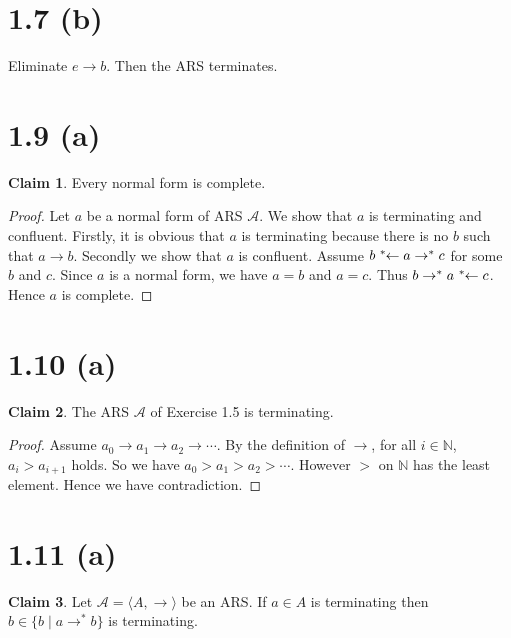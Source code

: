 \documentclass[autodetect-enginem]{article}
\title{}
\author{}
\date{}
\theoremstyle{plain}
\theoremstyle{definition}
\newtheorem*{claim*}{Claim}
\begin{document}
\section*{1.7 (b)}

Eliminate $e \rightarrow b$. Then the ARS terminates.

\section*{1.9 (a)}

\begin{claim*}
    Every normal form is complete.
\end{claim*}

\begin{proof}
    Let $a$ be a normal form of ARS $\mathcal{A}$.
    We show that $a$ is terminating and confluent.
    Firstly, it is obvious that $a$ is terminating because there is no $b$ such that $a \rightarrow b$.
    Secondly we show that $a$ is confluent.
    Assume $b \;\reflectbox{$\rightarrow^*$}\; a \rightarrow^* c$ for some $b$ and $c$.
    Since $a$ is a normal form, we have $a=b$ and $a=c$. Thus $b \rightarrow^* a \;\reflectbox{$\rightarrow^*$} \; c$.
    Hence $a$ is complete.
\end{proof}

\section*{1.10 (a)}

\begin{claim*}
    The ARS $\mathcal{A}$ of Exercise 1.5 is terminating.
\end{claim*}

\begin{proof}
    Assume $a_0 \to a_1 \to a_2 \to \cdots$.
    By the definition of $\to$, for all $i \in \mathbb{N}$, $a_i > a_{i+1}$ holds.
    So we have $a_0 > a_1 > a_2 > \cdots$.
    However $>$ on $\mathbb{N}$ has the least element.
    Hence we have contradiction.
\end{proof}


\section*{1.11 (a)}
\begin{claim*}
    Let $\mathcal{A} = \langle A, \to \rangle$ be an ARS. If $a \in A$ is terminating then
    $b \in \{b \mid a \rightarrow^* b\}$ is terminating.
\end{claim*}
\end{document}
